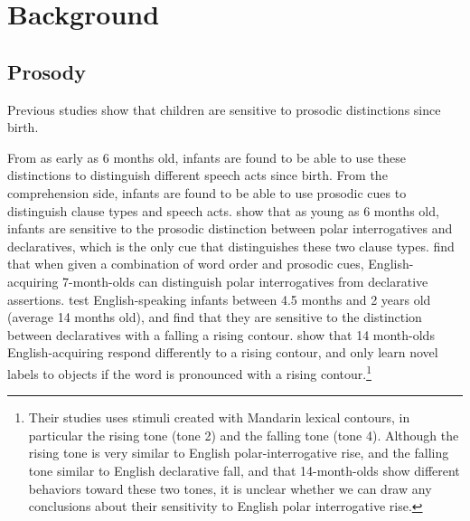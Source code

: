 \section{Background}
\label{sec:engsp:background}
\subsection{Prosody}
\label{sec:engsp:bg:prosody}

Previous studies show that children are sensitive to prosodic distinctions since birth. %


From as early as 6 months old, infants are found to be able to use these distinctions to distinguish different speech acts since birth. From the comprehension side, infants are found to be able to use prosodic cues to distinguish clause types and speech acts. \textcite{frota2014} show that as young as 6 months old, infants are sensitive to the prosodic distinction between polar interrogatives and declaratives, which is the only cue that distinguishes these two clause types. \textcite{geffenmintz2011} find that when given a combination of word order and prosodic cues, English-acquiring 7-month-olds can distinguish polar interrogatives from declarative assertions. \textcite{soderstrom2005clause} test English-speaking infants between 4.5 months and 2 years old (average 14 months old), and find that they are sensitive to the distinction between declaratives with a falling a rising contour. \textcite{} show that 14 month-olds English-acquiring respond differently to a rising contour, and only learn novel labels to objects if the word is pronounced with a rising contour.\footnote{Their studies uses stimuli created with Mandarin lexical contours, in particular the rising tone (tone 2) and the falling tone (tone 4). Although the rising tone is very similar to English polar-interrogative rise, and the falling tone similar to English declarative fall, and that 14-month-olds show different behaviors toward these two tones, it is unclear whether we can draw any conclusions about their sensitivity to English polar interrogative rise.}

